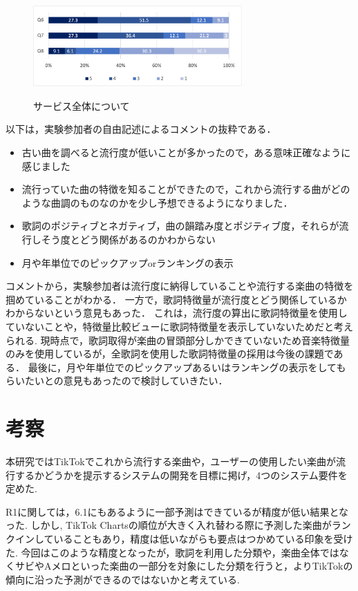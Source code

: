 \documentclass[titlepage]{jsreport}
\begin{document}
\begin{figure}[htb]
\begin{center}
\includegraphics[width=80mm]{images/all.png}
\label{table:total}
\caption{サービス全体について}
\end{center}
\end{figure}

以下は，実験参加者の自由記述によるコメントの抜粋である．
\begin{itemize}
\item 古い曲を調べると流行度が低いことが多かったので，ある意味正確なように感じました
\item 流行っていた曲の特徴を知ることができたので，これから流行する曲がどのような曲調のものなのかを少し予想できるようになりました．
\item 歌詞のポジティブとネガティブ，曲の韻踏み度とポジティブ度，それらが流行しそう度とどう関係があるのかわからない
\item 月や年単位でのピックアップorランキングの表示
\end{itemize}
コメントから，実験参加者は流行度に納得していることや流行する楽曲の特徴を掴めていることがわかる．
一方で，歌詞特徴量が流行度とどう関係しているかわからないという意見もあった．
これは，流行度の算出に歌詞特徴量を使用していないことや，特徴量比較ビューに歌詞特徴量を表示していないためだと考えられる. 
現時点で，歌詞取得が楽曲の冒頭部分しかできていないため音楽特徴量のみを使用しているが，全歌詞を使用した歌詞特徴量の採用は今後の課題である．
最後に，月や年単位でのピックアップあるいはランキングの表示をしてもらいたいとの意見もあったので検討していきたい．


\chapter{考察}
本研究ではTikTokでこれから流行する楽曲や，ユーザーの使用したい楽曲が流行するかどうかを提示するシステムの開発を目標に掲げ，4つのシステム要件を定めた.

R1に関しては，6.1にもあるように一部予測はできているが精度が低い結果となった.
しかし, TikTok Chartsの順位が大きく入れ替わる際に予測した楽曲がランクインしていることもあり，精度は低いながらも要点はつかめている印象を受けた.
今回はこのような精度となったが，歌詞を利用した分類や，楽曲全体ではなくサビやAメロといった楽曲の一部分を対象にした分類を行うと，よりTikTokの傾向に沿った予測ができるのではないかと考えている.
\end{document}
